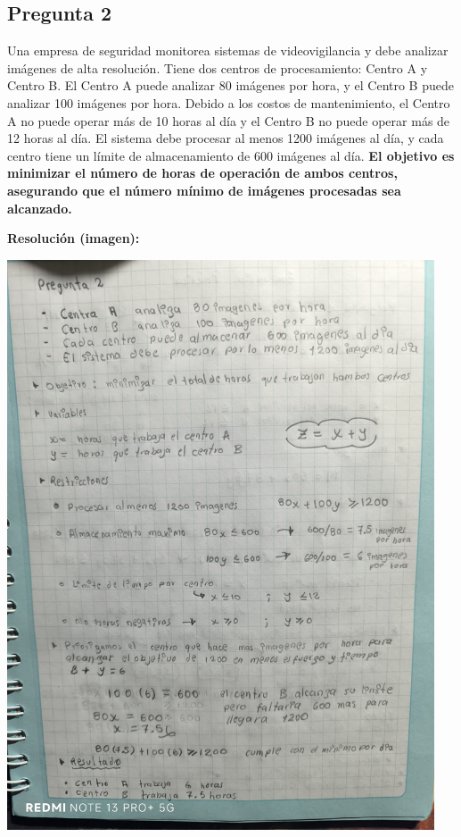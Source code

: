 \documentclass[a4paper,10pt]{article}
\begin{document}
\vspace{1cm}
\subsection*{Pregunta 2}

Una empresa de seguridad monitorea sistemas de videovigilancia y debe analizar imágenes de alta resolución.  
Tiene dos centros de procesamiento: Centro A y Centro B.  
El Centro A puede analizar 80 imágenes por hora, y el Centro B puede analizar 100 imágenes por hora.  
Debido a los costos de mantenimiento, el Centro A no puede operar más de 10 horas al día y el Centro B no puede operar más de 12 horas al día.  
El sistema debe procesar al menos 1200 imágenes al día, y cada centro tiene un límite de almacenamiento de 600 imágenes al día.  
\textbf{El objetivo es minimizar el número de horas de operación de ambos centros, asegurando que el número mínimo de imágenes procesadas sea alcanzado.}

\vspace{0.5cm}
\textbf{Resolución (imagen):}
\begin{center}
    \includegraphics[width=0.95\textwidth]{pregunta2.png}
\end{center}
\end{document}
